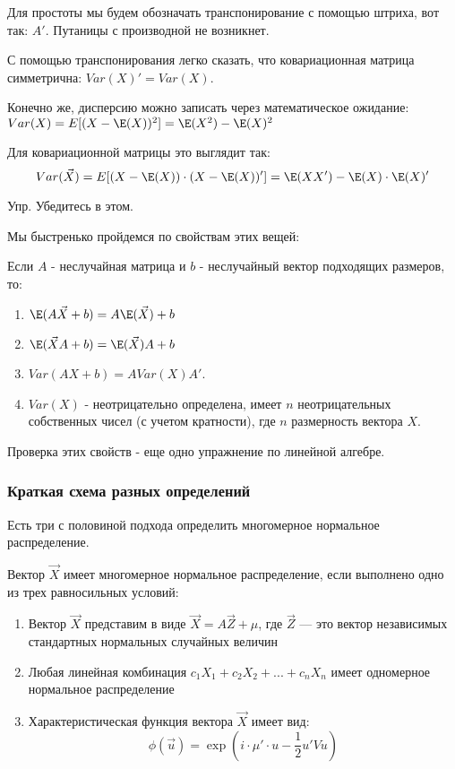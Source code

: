 Для простоты мы будем обозначать транспонирование с помощью штриха, вот так: $A'$. Путаницы с производной не возникнет.

С помощью транспонирования легко сказать, что ковариационная матрица симметрична: $Var(X)'=Var(X)$.

Конечно же, дисперсию можно записать через математическое ожидание: $Var(X)=E[(X-\E(X))^{2}]=\E(X^{2})-\E(X)^{2}$

Для ковариационной матрицы это выглядит так:
\begin{equation}
Var(\vec{X})=E[(X-\E(X))\cdot (X-\E(X))']=\E(XX')-\E(X)\cdot \E(X)'
\end{equation}

Упр. Убедитесь в этом.


Мы быстренько пройдемся по свойствам этих вещей:

Если $A$ - неслучайная матрица и $b$ - неслучайный вектор подходящих размеров, то:
\begin{enumerate}
\item $\E(A\vec{X}+b)=A\E(\vec{X})+b$
\item $\E(\vec{X}A+b)=\E(\vec{X})A+b$
\item $Var(AX+b)=AVar(X)A'$.
\item $Var(X)$ - неотрицательно определена, имеет $n$ неотрицательных собственных чисел (с учетом кратности), где $n$ размерность вектора $X$.
\end{enumerate}

Проверка этих свойств - еще одно упражнение по линейной алгебре.


\subsubsection*{Краткая схема разных определений}

Есть три с половиной подхода определить многомерное нормальное распределение.

Вектор $\vec{X}$ имеет многомерное нормальное распределение, если выполнено одно из трех равносильных условий:
\begin{enumerate}
\item Вектор $\vec{X}$ представим в виде $\vec{X}=A\vec{Z}+\mu$, где $\vec{Z}$ --- это вектор независимых стандартных нормальных случайных величин
\item Любая линейная комбинация $c_{1}X_{1}+c_{2}X_{2}+...+c_{n}X_{n}$ имеет одномерное нормальное распределение
\item Характеристическая функция вектора $\vec{X}$ имеет вид:
\begin{equation}
\phi(\vec{u})=\exp\left(i\cdot \mu'\cdot u-\frac{1}{2}u'Vu \right)
\end{equation}
\end{enumerate}

